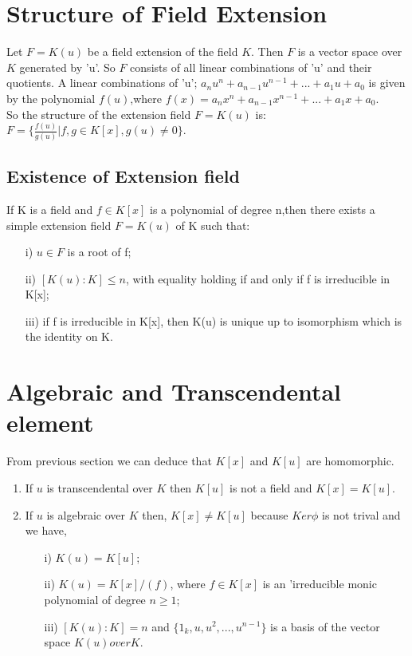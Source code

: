 \section{Structure of Field Extension}
Let \(F=K(u)\) be a field extension of the field \(K\). Then \(F\) is a vector space over \(K\) generated by 'u'. So \(F\) consists of all linear combinations of 'u' and their quotients. A linear combinations of 'u'; \(a_nu^n+a_{n-1}u^{n-1}+...+a_1u+a_0\) is given by the polynomial \(f(u)\),where \(f(x)=a_nx^n+a_{n-1}x^{n-1}+...+a_1x+a_0\).\\

So the structure of the extension field \(F=K(u)\) is:\\
\(F= \{\frac{f(u)}{g(u)}|f,g \in K[x],g(u) \neq 0\}\).


\subsection{Existence of Extension field}

  If K is a field and \(f \in K[x]\) is a polynomial of degree n,then there exists a simple extension field \(F=K(u)\) of K such that:\\
  \begin{enumerate}
  \item[i)] \(u \in F\) is a root of f;
  \item[ii)] \([K(u):K] \leq n\), with equality holding if and only if f is irreducible in K[x];
  \item[iii)] if f is irreducible in K[x], then K(u) is unique up to isomorphism which is the identity on K.
  \end{enumerate}

  \section{Algebraic and Transcendental element}
  From previous section we can deduce that \( K[x]\) and \(K[u]\) are homomorphic.\\
  \begin{enumerate}
  \item If \(u\) is transcendental over \(K\) then \(K[u]\) is not a field and \(K[x]=K[u]\).
  \item If \(u\) is algebraic over \(K\) then, \(K[x] \neq K[u]\) because \(Ker\phi\) is not trival and we have,
    \begin{enumerate}
    \item[i)] \(K(u)=K[u]\);
    \item[ii)] \(K(u)=K[x]/(f)\), where \(f \in K[x]\) is an 'irreducible monic polynomial of degree \(n \geq 1\);
    \item[iii)] \([K(u):K]=n\) and \(\{1_k,u,u^2,...,u^{n-1}\}\) is a basis of the vector space \(K(u) over K\).
    \end{enumerate}
  \end{enumerate}

